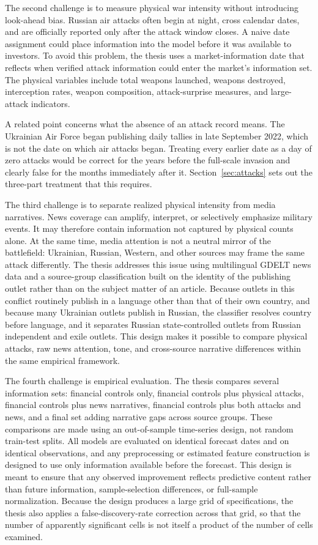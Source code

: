 \documentclass[12pt,a4paper]{article}
\begin{document}
The second challenge is to measure physical war intensity without introducing look-ahead bias. Russian air attacks often begin at night, cross calendar dates, and are officially reported only after the attack window closes. A naive date assignment could place information into the model before it was available to investors. To avoid this problem, the thesis uses a market-information date that reflects when verified attack information could enter the market's information set. The physical variables include total weapons launched, weapons destroyed, interception rates, weapon composition, attack-surprise measures, and large-attack indicators.

A related point concerns what the absence of an attack record means. The Ukrainian Air Force began publishing daily tallies in late September 2022, which is not the date on which air attacks began. Treating every earlier date as a day of zero attacks would be correct for the years before the full-scale invasion and clearly false for the months immediately after it. Section~\ref{sec:attacks} sets out the three-part treatment that this requires.

The third challenge is to separate realized physical intensity from media narratives. News coverage can amplify, interpret, or selectively emphasize military events. It may therefore contain information not captured by physical counts alone. At the same time, media attention is not a neutral mirror of the battlefield: Ukrainian, Russian, Western, and other sources may frame the same attack differently. The thesis addresses this issue using multilingual GDELT news data and a source-group classification built on the identity of the publishing outlet rather than on the subject matter of an article. Because outlets in this conflict routinely publish in a language other than that of their own country, and because many Ukrainian outlets publish in Russian, the classifier resolves country before language, and it separates Russian state-controlled outlets from Russian independent and exile outlets. This design makes it possible to compare physical attacks, raw news attention, tone, and cross-source narrative differences within the same empirical framework.

The fourth challenge is empirical evaluation. The thesis compares several information sets: financial controls only, financial controls plus physical attacks, financial controls plus news narratives, financial controls plus both attacks and news, and a final set adding narrative gaps across source groups. These comparisons are made using an out-of-sample time-series design, not random train-test splits. All models are evaluated on identical forecast dates and on identical observations, and any preprocessing or estimated feature construction is designed to use only information available before the forecast. This design is meant to ensure that any observed improvement reflects predictive content rather than future information, sample-selection differences, or full-sample normalization. Because the design produces a large grid of specifications, the thesis also applies a false-discovery-rate correction across that grid, so that the number of apparently significant cells is not itself a product of the number of cells examined.
\end{document}
